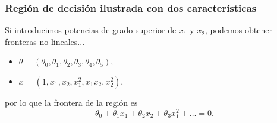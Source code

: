 \documentclass{beamer}
\begin{document}
\begin{frame}\frametitle{Región de decisión ilustrada con dos características}
 \begin{minipage}[t][5cm][t]{5.5cm}
          \end{minipage}
       \begin{minipage}[t][5cm][t]{4.5cm}
         \footnotesize
     Si introducimos potencias de grado superior de  $x_1$ y $x_2$, podemos obtener fronteras no lineales...
     \begin{itemize}
     \item $\theta=(\theta_0,\theta_1,\theta_2,\theta_3,\theta_4,\theta_5)$,
     \item $x=(1,x_1,x_2,x_1^2,x_1x_2, x_2^2)$,
     \end{itemize}
por lo que la frontera de la región es $$\theta_0+\theta_1x_1+\theta_2x_2+\theta_3x_1^2+\ldots=0.$$

     \end{minipage}\\

 \end{frame}
\end{document}

